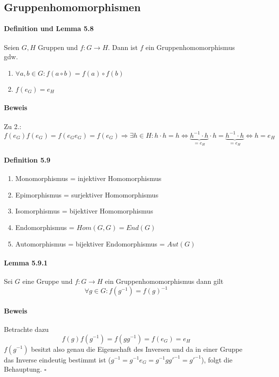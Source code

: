 \documentclass{scrartcl}
\newcommand{\ub}[2]{\underbrace{#1}_{#2}} %
\begin{document}
\subsection{Gruppenhomomorphismen}
\label{subsec:gruppenhomomorphismen}

\paragraph{Definition und Lemma 5.8} Seien $G, H$ Gruppen und $f: G \to H$. Dann ist $f$
ein Gruppenhomomorphismus gdw.
\begin{enumerate}
\item $\forall a,b \in G: f(a \circ b) = f(a) \circ f(b)$
\item $f(e_G) = e_H$
\end{enumerate}
\paragraph{Beweis}
Zu 2.:
\[
  f(e_G)f(e_G) = f(e_Ge_G) = f(e_G)
  \Rightarrow \exists h \in H: h \cdot h = h
  \Leftrightarrow \ub{h^{-1} \cdot h}{= e_H} \cdot h = \ub{h^{-1} \cdot h}{=e_H}
  \Leftrightarrow h = e_H
\]

\paragraph{Definition 5.9}
\begin{enumerate}
\item Monomorphismus = injektiver Homomorphismus
\item Epimorphismus = surjektiver Homomorphismus
\item Isomorphismus = bijektiver Homomorphismus
\item Endomorphismus = $Hom(G, G) = End(G)$
\item Automorphismus = bijektiver Endomorphismus = $Aut(G)$
\end{enumerate}

\paragraph{Lemma 5.9.1}
Sei $G$ eine Gruppe und $f:G \to H$ ein Gruppenhomomorphismus dann gilt
\[
  \forall g \in G: f(g^{-1}) = f(g)^{-1}
\]
\paragraph{Beweis}
Betrachte dazu
\[
  f(g)f(g^{-1}) = f(gg^{-1}) = f(e_G) = e_H 
\]
$f(g^{-1})$ besitzt also genau die Eigenschaft des Inversen und da in einer
Gruppe das Inverse eindeutig bestimmt ist
($g^{-1}=g^{-1}e_G=g^{-1}gg'^{-1}=g'^{-1}$), folgt die Behauptung.
\hfill $\square$
\end{document}
